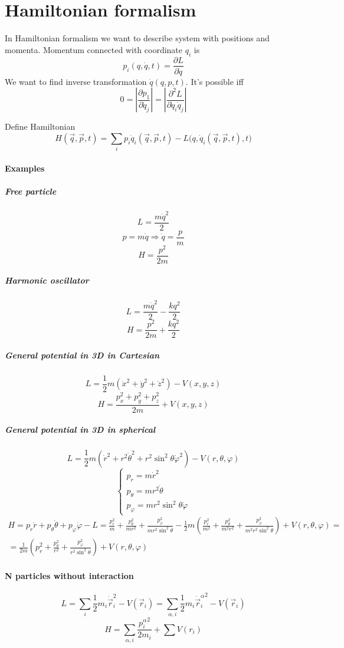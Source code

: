 \section{Hamiltonian formalism}
In Hamiltonian formalism we want to describe system with positions and momenta. Momentum connected with coordinate $q_i$ is
$$p_i(q,\dot{q},t) = \frac{\partial L}{\partial \dot{q}}$$
We want to find inverse transformation $\dot{q}(q,p,t)$. It's possible iff $$0 = \left| \frac{\partial p_1}{\partial \dot{q}_j} \right| = \left| \frac{\partial^2 L}{\partial \dot{q}_i \dot{q}_j} \right|$$

Define Hamiltonian
$$H(\vec{q}, \vec{p}, t) = \sum_i p_i\dot{q}_i(\vec{q}, \vec{p}, t) - L \big(q, \dot{q}_i(\vec{q}, \vec{p}, t) , t \big)$$

\paragraph{Examples}
\subparagraph{Free particle}
$$L = \frac{m \dot{q}^2}{2}$$
$$p = m\dot{q} \Rightarrow  \dot{q} =  \frac{p}{m}$$
$$H = \frac{p^2}{2m}$$
\subparagraph{Harmonic oscillator}
$$L = \frac{m\dot{q}^2}{2} - \frac{kq^2}{2}$$
$$H = \frac{p^2}{2m} + \frac{kq^2}{2}$$
\subparagraph{General potential in 3D in Cartesian}
$$L = \frac{1}{2} m\left(\dot{x}^2+\dot{y}^2+\dot{z}^2\right)- V(x,y,z)$$
$$H = \frac{p_x^2+p_y^2+p_z^2}{2m} + V(x,y,z)$$
\subparagraph{General potential in 3D in spherical}
$$L = \frac{1}{2} m\left(\dot{r}^2+r^2\dot{\theta}^2+r^2\sin^2 \theta \dot{\varphi}^2\right)- V(r,\theta, \varphi)$$
$$\begin{cases}
p_r = m\dot{r}^2\\
p_\theta = mr^2 \dot{\theta}\\
p_\varphi = mr^2\sin^2\theta \dot{\varphi}
\end{cases}$$
\begin{align*}
H = p_r\dot{r} + p_\theta \dot{\theta} +p_\varphi \dot{\varphi} - L = \frac{p_r^2}{m}+\frac{p_\theta^2}{mr^2}+\frac{p_\varphi^2}{mr^2\sin^2\theta} -\frac{1}{2} m\left(\frac{p_r^2}{m^2}+\frac{p_\theta^2}{m^2r^2}+\frac{p_\varphi^2}{m^2r^2\sin^2\theta}\right)+ V(r,\theta, \varphi)  =\\= \frac{1}{2m} \left(p_r^2+\frac{p_\theta^2}{r^2}+\frac{p_\varphi^2}{r^2\sin^2\theta}\right)+ V(r,\theta, \varphi)
\end{align*}


\paragraph{N particles without interaction}
$$L = \sum_i \frac{1}{2}m_i \dot{\vec{r}}_i^2 - V(\vec{r}_i) = \sum_{\alpha, i} \frac{1}{2}m_i {\dot{\vec{r}}_i^\alpha}^2 - V(\vec{r}_i)$$
$$H = \sum_{\alpha, i}  \frac{{p_i^\alpha}^2}{2m_i} + \sum V(r_i)$$
